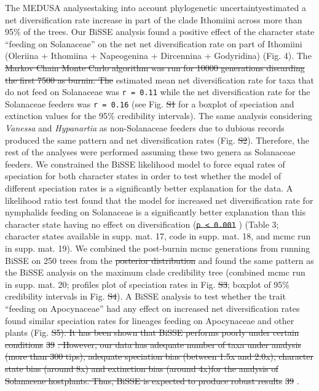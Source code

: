 \documentclass[10pt]{article}
\providecommand{\DIFaddtex}[1]{{\protect\color{blue}\uwave{#1}}} %
\providecommand{\DIFdeltex}[1]{{\protect\color{red}\sout{#1}}}                      %
\providecommand{\DIFaddbegin}{} %
\providecommand{\DIFaddend}{} %
\providecommand{\DIFdelbegin}{} %
\providecommand{\DIFdelend}{} %
\providecommand{\DIFadd}[1]{\texorpdfstring{\DIFaddtex{#1}}{#1}} %
\providecommand{\DIFdel}[1]{\texorpdfstring{\DIFdeltex{#1}}{}} %
\begin{document}
The MEDUSA analyses\DIFaddbegin \DIFadd{, }\DIFaddend taking into account phylogenetic uncertainty\DIFaddbegin \DIFadd{,
}\DIFaddend estimated a net diversification rate increase in part of the clade
Ithomiini across more than 95\% of the trees. Our BiSSE analysis found a
positive effect of the character state ``feeding on Solanaceae'' on the
net net diversification rate on part of Ithomiini (Oleriina + Ithomiina
+ Napeogenina + Dircennina + Godyridina) (Fig. 4). The \DIFdelbegin \DIFdel{Markov Chain
Monte Carlo algorithm was run for 10000 generations discarding the first
7500 as burnin. The }\DIFdelend estimated mean
net diversification rate for taxa that do not feed on Solanaceae was
\texttt{r = 0.11} while the net diversification rate for the Solanaceae
feeders was \texttt{r = 0.16} (see Fig. \DIFdelbegin \DIFdel{S1 }\DIFdelend \DIFaddbegin \DIFadd{S2 }\DIFaddend for a boxplot of speciation
and extinction values for the 95\% credibility intervals). The same
analysis considering \emph{Vanessa} and \emph{Hypanartia} as
non-Solanaceae feeders due to dubious records produced the same pattern
and net diversification rates (Fig. \DIFdelbegin \DIFdel{S2}\DIFdelend \DIFaddbegin \DIFadd{S3}\DIFaddend ). Therefore, the rest of the
analyses were performed assuming these two genera as Solanaceae feeders.
We constrained the BiSSE likelihood model to force equal rates of
speciation for both character states in order to test whether the model
of different speciation rates is a significantly better explanation for
the data. A likelihood ratio test found that the model for increased net
diversification rate for nymphalids feeding on Solanaceae is a
significantly better explanation than this character state having no
effect on diversification (\DIFdelbegin \texttt{\DIFdel{p \textless{} 0.001}}%
\DIFdelend \DIFaddbegin \DIFadd{\(\chi^2 = 12.3; 1 df; p < 0.001\)}\DIFaddend ) (Table 3;
character states available in supp. mat. 17, code in supp. mat. 18, and
mcmc run in supp. mat. 19). We combined the post-burnin mcmc generations
from running BiSSE on 250 trees from the \DIFdelbegin \DIFdel{posterior distribution }\DIFdelend \DIFaddbegin \DIFadd{random sample of 1000 trees }\DIFaddend and
found the same pattern as the BiSSE analysis on the maximum clade
credibility tree (combined mcmc run in supp. mat. 20; profiles plot of
speciation rates in Fig. \DIFdelbegin \DIFdel{S3}\DIFdelend \DIFaddbegin \DIFadd{S4}\DIFaddend ; boxplot of 95\% credibility intervals in
Fig. \DIFdelbegin \DIFdel{S4}\DIFdelend \DIFaddbegin \DIFadd{S5}\DIFaddend ). A BiSSE analysis to test whether the trait ``feeding on
Apocynaceae'' had any effect on increased net diversification rates
found similar speciation rates for lineages feeding on Apocynaceae and
other plants (Fig. \DIFdelbegin \DIFdel{S5). It has been shown
that BiSSE performs poorly under certain conditions }%
\DIFdel{39}%
\DIFdel{. However,
our data has adequate number of taxa under analysis (more than 300
tips), adequate speciation bias (between 1.5x and 2.0x), character state
bias (around 8x) and extinction bias (around 4x)for the analysis of
Solanaceae hostplants. Thus, BiSSE is expected to produce robust results
}%
\DIFdel{39}%
\DIFdelend \DIFaddbegin \DIFadd{S6)}\DIFaddend .
\end{document}
